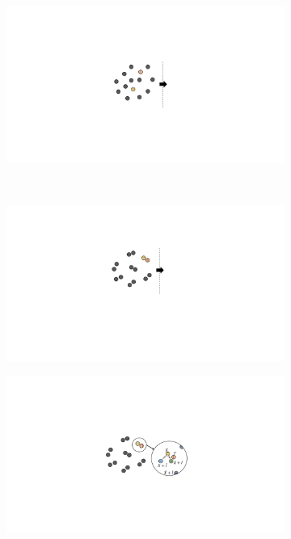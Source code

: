 
\begin{figure}[H]
    \centering
    \begin{subfigure}[b]{0.3\textwidth} %
      \includegraphics[width=\textwidth]{Img/fig_5_cat_a.pdf}
      \caption{}
      \label{fig:5_cat_a}
    \end{subfigure}%
    ~%
    \begin{subfigure}[b]{0.26\textwidth} %
      \includegraphics[width=\textwidth]{Img/fig_5_cat_b.pdf}
      \caption{}
      \label{fig:5_cat_b}
    \end{subfigure}
    \begin{subfigure}[b]{0.38\textwidth} %
      \includegraphics[width=\textwidth]{Img/fig_5_cat_c.pdf}

\end{subfigure}
\end{figure}
